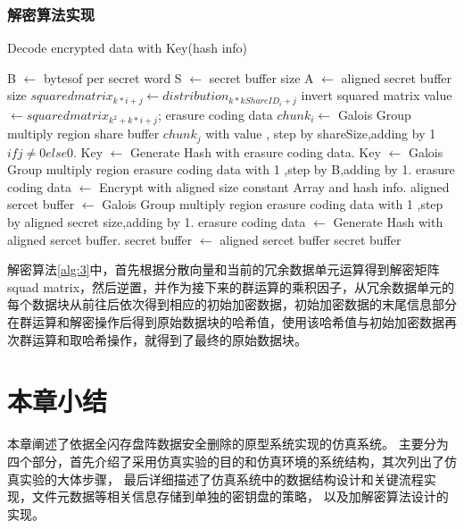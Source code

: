 \subsubsection{解密算法实现}
\begin{algorithm}[H]
	\caption{Decode encrypted data with Key(hash info)}
	\label{alg:3}
	\begin{algorithmic}
		\STATE B $\gets$ bytesof per secret word
		\STATE S $\gets$ secret buffer size
		\STATE A $\gets$ aligned secret buffer size
		\STATE $squared matrix_{k*i+j} \gets distribution_{k*kShareID_{i}+j}$
		\ENDFOR
		\ENDFOR
		\STATE invert squared matrix
		\STATE value $\gets squared matrix_{k^2+k*i+j}$;
		\STATE erasure coding data $chunk_i \gets$ Galois Group multiply region  share buffer $chunk_j$ with value ,
		step by shareSize,adding by 1 $if j \neq 0 else 0$.
		\ENDFOR
		\ENDFOR
		\STATE Key $\gets$ Generate Hash with erasure coding data.
		\STATE Key $\gets$ Galois Group multiply region  erasure coding data with 1 ,step by B,adding by 1.
		\STATE erasure coding data $\gets$ Encrypt with aligned size constant Array and hash info.
		\STATE aligned sercet buffer $\gets$ Galois Group multiply region  erasure coding data with 1 ,step by aligned secret size,adding by 1.
		\STATE erasure coding data $\gets$ Generate Hash with aligned sercet buffer.
		\STATE secret buffer $\gets$ aligned sercet buffer
		\RETURN secret buffer
	\end{algorithmic}
\end{algorithm}
解密算法\autoref{alg:3}中，首先根据分散向量和当前的冗余数据单元运算得到解密矩阵squad matrix，然后逆置，并作为接下来的群运算的乘积因子，从冗余数据单元的每个数据块从前往后依次得到相应的初始加密数据，初始加密数据的末尾信息部分在群运算和解密操作后得到原始数据块的哈希值，使用该哈希值与初始加密数据再次群运算和取哈希操作，就得到了最终的原始数据块。
\section{本章小结}
本章阐述了依据全闪存盘阵数据安全删除的原型系统实现的仿真系统。
主要分为四个部分，首先介绍了采用仿真实验的目的和仿真环境的系统结构，其次列出了仿真实验的大体步骤，
最后详细描述了仿真系统中的数据结构设计和关键流程实现，文件元数据等相关信息存储到单独的密钥盘的策略，
以及加解密算法设计的实现。
